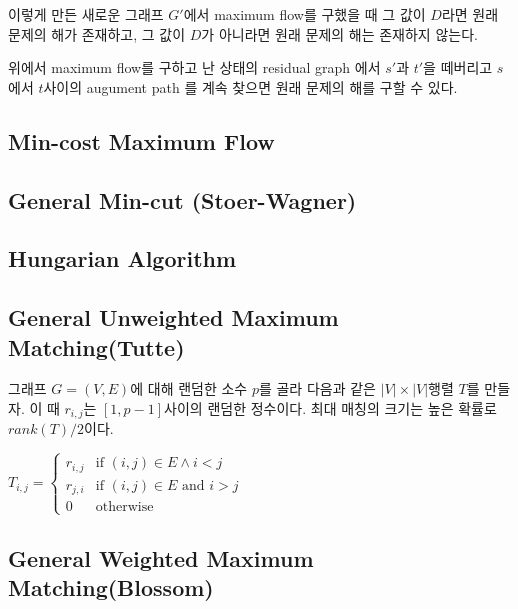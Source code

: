 \documentclass[9pt,landscape,a4paper,twocolumn]{extarticle}
\begin{document}
이렇게 만든 새로운 그래프 $G'$에서 maximum flow를 구했을 때 그 값이 $D$라면 원래 문제의 해가 존재하고, 그 값이 $D$가 아니라면 원래 문제의 해는 존재하지 않는다.

위에서 maximum flow를 구하고 난 상태의 residual graph 에서 $s'$과 $t'$을 떼버리고 $s$에서 $t$사이의 augument path 를 계속 찾으면 원래 문제의 해를 구할 수 있다.



\subsection{Min-cost Maximum Flow}


\subsection{General Min-cut (Stoer-Wagner)}


\subsection{Hungarian Algorithm}


\subsection{General Unweighted Maximum Matching(Tutte)}
그래프 $G=(V,E)$에 대해 랜덤한 소수 $p$를 골라 다음과 같은 $|V| \times |V|$행렬 $T$를 만들자. 이 때 $r_{i,j}$는 $[1,p-1]$사이의 랜덤한 정수이다.
최대 매칭의 크기는 높은 확률로 $rank(T)/2$이다.

$T_{i,j} = \begin{cases} r_{i,j} & \text{if } (i,j) \in E \land i < j
    \\ r_{j,i} & \text{if } (i,j) \in E \text{ and } i > j
    \\ 0 & \text{otherwise} \end{cases}$

\subsection{General Weighted Maximum Matching(Blossom)}


% 
\end{document}
